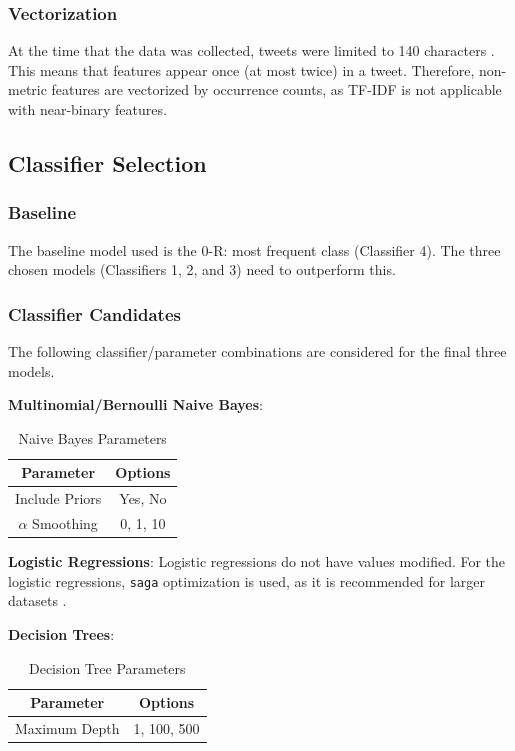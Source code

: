 \documentclass[11pt]{article}
\begin{document}
\subsubsection{Vectorization}

At the time that the data was collected, tweets were limited to 140 characters \cite{tweetlen}.
This means that features appear once (at most twice) in a tweet.
Therefore, non-metric features are vectorized by occurrence counts, 
as TF-IDF is not applicable with near-binary features. 

\subsection{Classifier Selection}

\subsubsection{Baseline}

The baseline model used is the 0-R: most frequent class (Classifier 4).
The three chosen models (Classifiers 1, 2, and 3) need to outperform this.

\subsubsection{Classifier Candidates}\label{sec:allcandidates}

The following classifier/parameter combinations are considered for the final three models. 

\textbf{Multinomial/Bernoulli Naive Bayes}:
\begin{table}[h]
	\begin{center}
		\begin{tabular}{|c|c|}			
			\hline
			Parameter & Options \\
			\hline
			Include Priors & Yes, No \\
			$\alpha$ Smoothing & 0, 1, 10 \\
			\hline
		\end{tabular}
		\caption{Naive Bayes Parameters}
		\label{tbl:nb-options}
	\end{center}
\end{table}

\textbf{Logistic Regressions}:
Logistic regressions do not have values modified.
For the logistic regressions, \texttt{saga} optimization is used, as it is recommended for larger datasets \cite{skl}.

\textbf{Decision Trees}:
\begin{table}[h]
	\begin{center}
		\begin{tabular}{|c|c|}			
			\hline
			Parameter & Options \\
			\hline
			Maximum Depth & 1, 100, 500 \\
			\hline
		\end{tabular}
		\caption{Decision Tree Parameters}
		\label{tbl:dt-options}
	\end{center}
\end{table}
\end{document}
